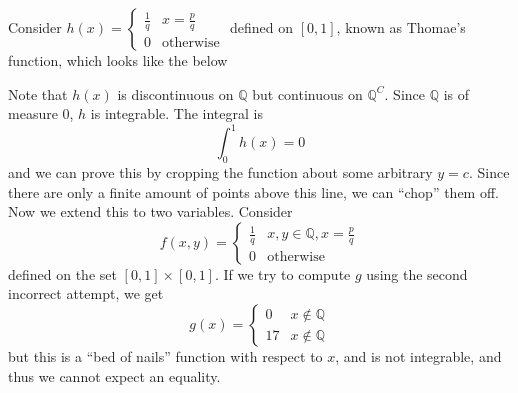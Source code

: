 \documentclass{article}
\numberwithin{equation}{section}
\begin{document}
Consider $h(x) = \begin{cases}
        \frac{1}{q} & x = \frac{p}{q}  \\
        0           & \text{otherwise}
    \end{cases}$ defined on $[0,1]$, known as Thomae's function, which looks like the below
\begin{center}
\end{center}
Note that $h(x)$ is discontinuous on $\mathbb{Q}$ but continuous on $\mathbb{Q}^C$. Since $\mathbb{Q}$ is of measure $0$, $h$ is integrable. The integral is
\begin{equation}
    \int_0^1 h(x) = 0
\end{equation}
and we can prove this by cropping the function about some arbitrary $y=c.$ Since there are only a finite amount of points above this line, we can ``chop'' them off. Now we extend this to two variables. Consider
\begin{equation}
    f(x,y) = \begin{cases}
        \frac{1}{q} & x,y\in \mathbb{Q}, x=\frac{p}{q} \\
        0           & \text{otherwise}
    \end{cases}
\end{equation}
defined on the set $[0,1]\times [0,1]$. If we try to compute $g$ using the second incorrect attempt, we get
\begin{equation}
    g(x) = \begin{cases}
        0  & x \notin \mathbb{Q} \\
        17 & x \notin \mathbb{Q}
    \end{cases}
\end{equation}
but this is a ``bed of nails'' function with respect to $x$, and is not integrable, and thus we cannot expect an equality.
\end{document}
